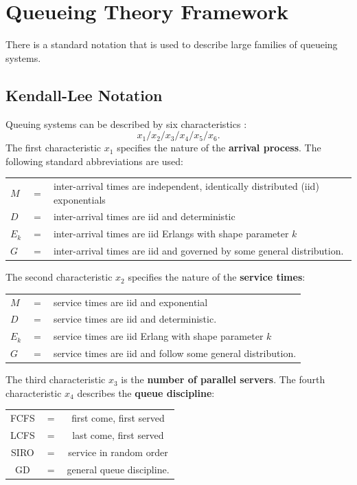 
\section{Queueing Theory Framework}
There is a standard notation that is used to describe large families of queueing systems.
\subsection{Kendall-Lee Notation}
Queuing systems can be described by six characteristics \cite{QS_K}: $$x_1/x_2/x_3/x_4/x_5/x_6.$$
The first characteristic $x_1$ specifies the nature of the \textbf{arrival process}. The following standard abbreviations are used:
\newl \begin{tabular}{p{0.25cm}p{0.25cm}p{15cm}}
$M$ &$=$& inter-arrival times are independent, identically distributed (iid) exponentials\\
$D$ &$=$& inter-arrival times are iid and deterministic\\
$E_{k}$ &$=$& inter-arrival times are iid Erlangs with shape parameter $k$\\
$G$ &$=$& inter-arrival times are iid and governed by some general distribution.
\end{tabular}
\newpage\noindent
The second characteristic $x_2$ specifies the nature of the \textbf{service times}:
\newline \newline
\begin{tabular}{p{0.25cm}p{}p{12cm}}
$M$ &$=$& service times are iid and exponential\\
$D$ &$=$&  service times are iid and deterministic.\\
$E_{k}$ &$=$& service times are iid Erlang with shape parameter $k$\\
$G$ &$=$& service times are iid and follow some general distribution.
\end{tabular}
\newl
The third characteristic $x_3$ is the \textbf{number of parallel servers}. The fourth characteristic $x_4$ describes
the \textbf{queue discipline}:
\newl
\begin{tabular}{ccc}
FCFS &$=$& first come, first served\\
LCFS &$=$& last come, first served\\
SIRO &$=$& service in random order\\
GD &$=$& general queue discipline.
\end{tabular}

